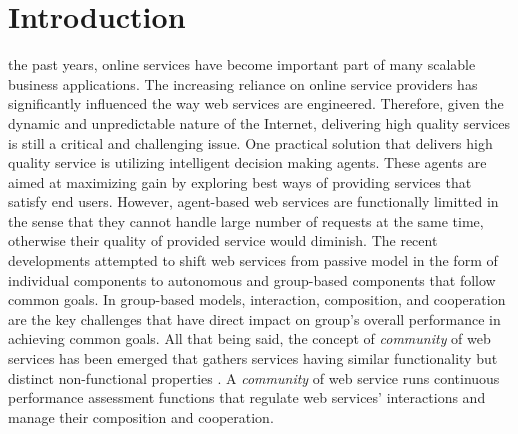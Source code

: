 \documentclass[10pt,journal,cspaper,compsoc]{IEEEtran}
\begin{document}
\maketitle


\IEEEdisplaynotcompsoctitleabstractindextext


%
\IEEEpeerreviewmaketitle


\section{Introduction}

 the past years, online services have become important part of many scalable business applications. The increasing reliance on online service providers has significantly influenced the way web services are engineered. Therefore, given the dynamic and unpredictable nature of the Internet, delivering high quality services is still a critical and challenging issue. One practical solution that delivers high quality service is utilizing intelligent decision making agents. These agents are aimed at maximizing gain by exploring best ways of providing services that satisfy end users. However, agent-based web services are functionally limitted in the sense that they cannot handle large number of requests at the same time, otherwise their quality of provided service would diminish. The recent developments attempted to shift web services from passive model in the form of individual components to autonomous and group-based components that follow common goals. In group-based models, interaction, composition, and cooperation are the key challenges \cite{ICWS2011-1, SCC2011-1, journals/mags/BaldoniBM10, journals/jcss/CasadoYT13} that have direct impact on group's overall performance in achieving common goals. All that being said, the concept of \emph{community} of web services has been emerged that gathers services having similar functionality but distinct non-functional properties \cite{Zeng:2003:QDW:775152.775211, Paik:2005:TSS:2229263.2230038, Medjahed05adynamic, 10.1109/ARES.2008.7}. A \emph{community} of web service runs continuous performance assessment functions that regulate web services' interactions and manage their composition and cooperation.
\end{document}
